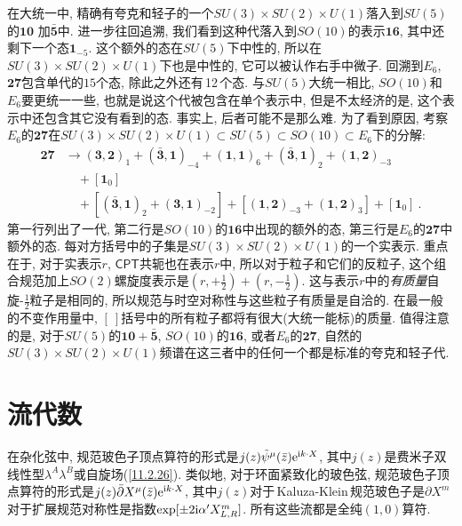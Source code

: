 在大统一中, 精确有夸克和轻子的一个$ SU(3)\times SU(2)\times U(1) $落入到$ SU(5) $的$ \mathbf{10} $%
加$ \bar{\mathbf{5}} $中. 进一步往回追溯, 我们看到这种代落入到$ SO(10) $的表示$ \mathbf{16} $, 其中还剩下一个态$ \mathbf{1}_{-5}$. 这个额外的态在$ SU(5) $下中性的, 所以在$ SU(3)\times SU(2)\times U(1) $下也是中性的, 它可以被认作右手中微子. 回溯到$ E_{6}$, $\mathbf{27} $包含单代的$ 15 $个态, 除此之外还有\,12\,个态. 与$ SU(5) $大统一相比, $SO(10) $和$ E_{6} $要更统一一些, 也就是说这个代被包含在单个表示中, 但是不太经济的是, 这个表示中还包含其它没有看到的态. 事实上, 后者可能不是那么难. 为了看到原因, 考察$ E_{6} $的$ \mathbf{27} $在$ SU(3)\times SU(2)\times U(1)\subset SU(5)\subset SO(10)\subset E_{6} $下的分解:
\begin{align}
    \mathbf{27} &\to (\mathbf{3},\mathbf{2})_{1} + (\bar{\mathbf{3}},\mathbf{1})_{-4}
    +(\mathbf{1},\mathbf{1})_{6} + (\bar{\mathbf{3}},\mathbf{1})_{2}+(\mathbf{1},\mathbf{2})_{-3} \nonumber \\
    &\quad + [\mathbf{1}_{0}] \nonumber \\
    &\quad +[(\bar{\mathbf{3}},\mathbf{1})_{2}+(\mathbf{3},\mathbf{1})_{-2}]
    +[(\mathbf{1},\mathbf{2})_{-3}+(\mathbf{1},\mathbf{2})_{3}] + [\mathbf{1}_{0}] \:. \label{11.4.25}
\end{align}
第一行列出了一代, 第二行是$ SO(10) $的$ \mathbf{16} $中出现的额外的态, 第三行是$ E_{6} $的$ \mathbf{27} $中额外的态. 每对方括号中的子集是$ SU(3)\times SU(2)\times U(1) $的一个实表示. 重点在于, 对于实表示$ r$, $ \textsf{CPT} $共轭也在表示$ r $中, 所以对于粒子和它们的反粒子, 这个组合规范加上$ SO(2) $螺旋度表示是$ (r,+\frac{1}{2})+(r,-\frac{1}{2})$. 这与表示$ r $中的{\emph{有质量}}自旋-$\frac{1}{2} $粒子是相同的, 所以规范与时空对称性与这些粒子有质量是自洽的. 在最一般的不变作用量中, $[\:] $括号中的所有粒子都将有很大(大统一能标)的质量. 值得注意的是, 对于$ SU(5) $的$ \mathbf{10}+\bar{\mathbf{5}}$, $SO(10) $的$ \mathbf{16}$, 或者$ E_{6} $的$ \mathbf{27}$, 自然的$ SU(3)\times SU(2)\times U(1) $频谱在这三者中的任何一个都是标准的夸克和轻子代.

\section{流代数}

在杂化弦中, 规范玻色子顶点算符的形式是$ j(z)\tilde{\psi}^{\mu}(\bar{z})\mathrm{e}^{\mathrm{i} k\cdot X}$, 其中$ j(z) $是费米子双线性型$ \lambda^{A}\lambda^{B} $或自旋场(\ref{11.2.26}). 类似地, 对于环面紧致化的玻色弦, 规范玻色子顶点算符的形式是$ j(z)\bar{\partial}X^{\mu}(\bar{z})\mathrm{e}^{\mathrm{i} k\cdot X}$, 其中$ j(z) $对于\,Kaluza-Klein\,规范玻色子是$ \partial X^{m} $对于扩展规范对称性是指数$ \exp[\pm 2\mathrm{i}\alpha^{\prime}X^{m}_{L,R}]$. 所有这些流都是全纯$ (1,0) $算符.

